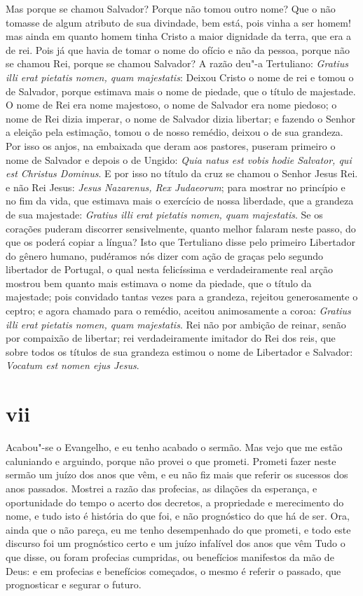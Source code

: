 Mas porque se chamou Salvador? Porque não tomou outro nome? Que o não
tomasse de algum atributo de sua divindade, bem está, pois vinha a ser
homem! mas ainda em quanto homem tinha Cristo a maior dignidade da
terra, que era a de rei. Pois já que havia de tomar o nome do ofício e
não da pessoa, porque não se chamou Rei, porque se chamou Salvador? A
razão deu"-a Tertuliano: \emph{Gratius illi erat pietatis nomen, quam
majestatis}: Deixou Cristo o nome de rei e tomou o de Salvador, porque
estimava mais o nome de piedade, que o título de majestade. O nome de
Rei era nome majestoso, o nome de Salvador era nome piedoso; o nome de
Rei dizia imperar, o nome de Salvador dizia libertar; e fazendo o Senhor
a eleição pela estimação, tomou o de nosso remédio, deixou o de sua
grandeza. Por isso os anjos, na embaixada que deram aos pastores,
puseram primeiro o nome de Salvador e depois o de Ungido: \emph{Quia
natus est vobis hodie Salvator, qui est Christus Dominus}. E por isso no
título da cruz se chamou o Senhor Jesus Rei. e não Rei Jesus:
\emph{Jesus Nazarenus, Rex Judaeorum}; para mostrar no princípio e no
fim da vida, que estimava mais o exercício de nossa liberdade, que a
grandeza de sua majestade: \emph{Gratius illi erat pietatis nomen, quam
majestatis}.
Se os corações puderam discorrer sensivelmente, quanto melhor falaram
neste passo, do que os poderá copiar a língua? Isto que Tertuliano disse
pelo primeiro Libertador do gênero humano, pudéramos nós dizer com ação
de graças
pelo segundo libertador de Portugal, o qual nesta felicíssima e
verdadeiramente real arção mostrou bem quanto mais estimava o nome da
piedade, que o título da majestade; pois convidado tantas vezes para a
grandeza, rejeitou generosamente o ceptro; e agora chamado para o
remédio, aceitou animosamente a coroa: \emph{Gratius illi erat pietatis
nomen, quam majestatis}. Rei não por ambição de reinar, senão por
compaixão de libertar; rei verdadeiramente imitador do Rei dos reis, que
sobre todos os títulos de sua grandeza estimou o nome de Libertador e
Salvador: \emph{Vocatum est nomen ejus Jesus}.

\section{vii}

Acabou"-se o Evangelho, e eu tenho acabado o sermão. Mas vejo que me
estão caluniando e arguindo, porque não provei o que prometi. Prometi
fazer neste sermão um juízo dos anos que vêm, e eu não fiz mais que
referir os sucessos dos anos passados. Mostrei a razão das profecias, as
dilações da esperança, e oportunidade do tempo o acerto dos decretos, a
propriedade e merecimento do nome, e tudo isto é história do que foi, e
não prognóstico do que há de ser. Ora, ainda que o não pareça, eu me
tenho desempenhado do que prometi, e todo este discurso foi um
prognóstico certo e um juízo infalível dos anos que vêm Tudo o que
disse, ou foram profecias cumpridas, ou benefícios manifestos da mão de
Deus: e em profecias e benefícios começados, o mesmo é referir o
passado, que prognosticar e segurar o futuro.

